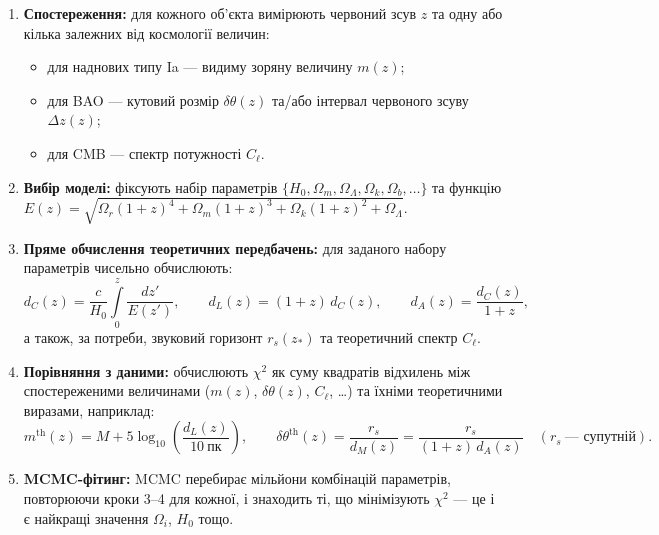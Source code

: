 \begin{enumerate}
    \item \textbf{Спостереження:} для кожного об'єкта вимірюють
    червоний зсув $z$ та одну або кілька залежних від космології
    величин:
    \begin{itemize}
        \item для наднових типу Ia --- видиму зоряну величину $m(z)$;
        \item для BAO --- кутовий розмір $\delta\theta(z)$ та/або
        інтервал червоного зсуву $\Delta z(z)$;
        \item для CMB --- спектр потужності $C_\ell$.
    \end{itemize}

    \item \textbf{Вибір моделі:} фіксують набір параметрів
    $\{H_0, \Omega_m, \Omega_\Lambda, \Omega_k, \Omega_b, \dots\}$
    та функцію $E(z) = \sqrt{\Omega_r(1+z)^4 + \Omega_m(1+z)^3
    + \Omega_k(1+z)^2 + \Omega_\Lambda}$.

    \item \textbf{Пряме обчислення теоретичних передбачень:}
    для заданого набору параметрів чисельно обчислюють:
    \begin{equation*}
    d_C(z) = \frac{c}{H_0} \int\limits_0^z \frac{dz'}{E(z')},
    \qquad
    d_L(z) = (1+z)\,d_C(z),
    \qquad
    d_A(z) = \frac{d_C(z)}{1+z},
    \end{equation*}
    а також, за потреби, звуковий горизонт $r_s(z_*)$ та
    теоретичний спектр $C_\ell$.

    \item \textbf{Порівняння з даними:} обчислюють $\chi^2$ як
    суму квадратів відхилень між спостереженими величинами
    ($m(z)$, $\delta\theta(z)$, $C_\ell$, \dots) та їхніми
    теоретичними виразами, наприклад:
    \begin{equation*}
    m^{\text{th}}(z) = M + 5\log_{10}\!\left(\frac{d_L(z)}{10\ \text{пк}}\right),
    \qquad
    \delta\theta^{\text{th}}(z) = \frac{r_s}{d_M(z)} = \frac{r_s}{(1+z)\,d_A(z)}
    \quad(r_s\ \text{--- супутній}).
    \end{equation*}

    \item \textbf{MCMC-фітинг:} MCMC перебирає мільйони комбінацій
    параметрів, повторюючи кроки 3--4 для кожної, і знаходить ті,
    що мінімізують $\chi^2$ --- це і є найкращі значення
    $\Omega_i$, $H_0$ тощо.
\end{enumerate}

